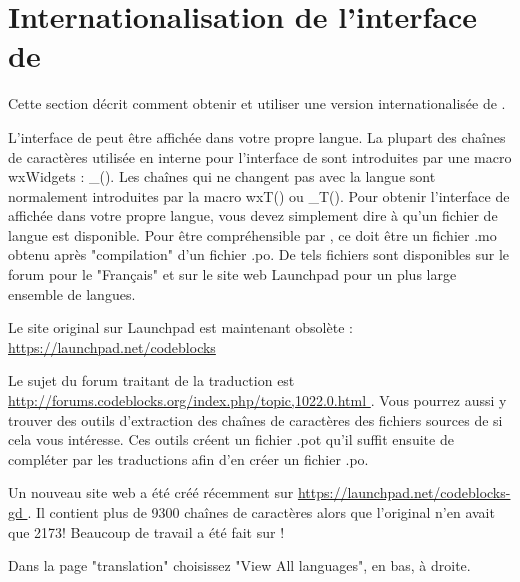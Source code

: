 ﻿\section{Internationalisation de l'interface de \codeblocks}\label{sec:cb_Internationalization}

Cette section décrit comment obtenir et utiliser une version internationalisée de \codeblocks.

L'interface de \codeblocks peut être affichée dans votre propre langue. La plupart des chaînes de caractères utilisée en interne pour l'interface de \codeblocks sont introduites par une macro wxWidgets : \_(). Les chaînes qui ne changent pas avec la langue sont normalement introduites par la macro wxT() ou \_T(). Pour obtenir l'interface de \codeblocks affichée dans votre propre langue, vous devez simplement dire à \codeblocks qu'un fichier de langue est disponible. Pour être compréhensible par \codeblocks, ce doit être un fichier .mo obtenu après "compilation" d'un fichier .po. De tels fichiers sont disponibles sur le forum pour le "Français" et sur le site web Launchpad pour un plus large ensemble de langues.

\begin{description}
\item Le site original sur Launchpad est maintenant obsolète : \url{https://launchpad.net/codeblocks }
\item Le sujet du forum traitant de la traduction est \url{http://forums.codeblocks.org/index.php/topic,1022.0.html }. Vous pourrez aussi y trouver des outils d'extraction des chaînes de caractères des fichiers sources de \codeblocks si cela vous intéresse. Ces outils créent un fichier .pot qu'il suffit ensuite de compléter par les traductions afin d'en créer un fichier .po.
\item Un nouveau site web a été créé récemment sur \url{https://launchpad.net/codeblocks-gd }. Il contient plus de 9300 chaînes de caractères alors que l'original n'en avait que 2173! Beaucoup de travail a été fait sur \codeblocks !
\end{description}

Dans la page "translation" choisissez "View All languages", en bas, à droite.

